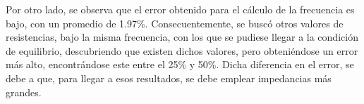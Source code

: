 Por otro lado, se observa que el error obtenido para el cálculo de la frecuencia es bajo, con un promedio de 1.97\%. Consecuentemente, se buscó otros valores de resistencias, bajo la misma frecuencia, con los que se pudiese llegar a la condición de equilibrio, descubriendo que existen dichos valores, pero obteniéndose un error más alto, encontrándose este entre el 25\% y 50\%. Dicha diferencia en el error, se debe a que, para llegar a esos resultados, se debe emplear impedancias más grandes.